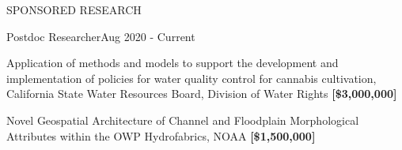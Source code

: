\documentclass{resume_anzy} %
\begin{document}
\vspace{2.5mm}

\begin{rSection}{SPONSORED RESEARCH}

\begin{rSubsection}{Postdoc Researcher}{Aug 2020 - Current}{}{}
\item  Application of methods and models to support the development and implementation of policies for water quality control for cannabis cultivation, California State Water Resources Board, Division of Water Rights \textbf{[\$3,000,000]}


\item Novel Geospatial Architecture of Channel and Floodplain Morphological Attributes within the OWP Hydrofabrics, NOAA \textbf{[\$1,500,000]}

\end{rSubsection}
\end{rSection}

\pagebreak 
\end{document}
